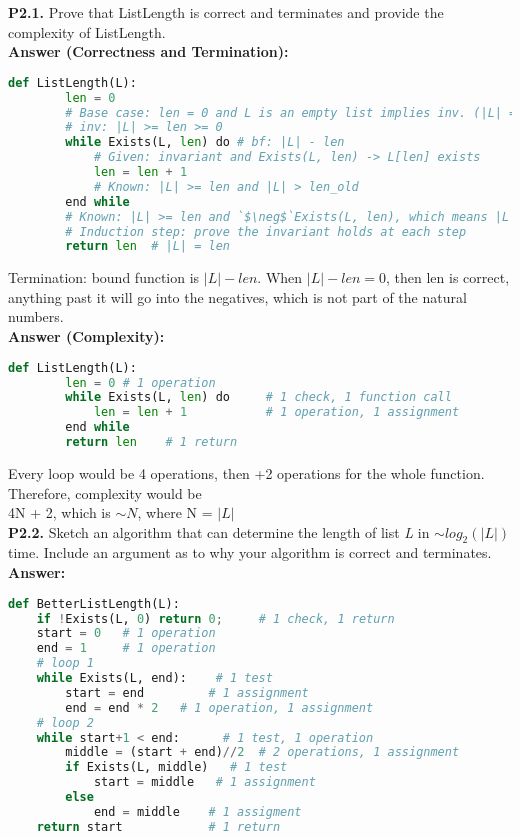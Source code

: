 \documentclass{article}
\begin{document}
\noindent
\textbf{P2.1.} Prove that ListLength is correct and terminates and provide the complexity of ListLength. \\

\noindent \textbf{Answer (Correctness and Termination): }

\begin{lstlisting}[language=Python]
    def ListLength(L):
        len = 0
        # Base case: len = 0 and L is an empty list implies inv. (|L| = len = 0)
        # inv: |L| >= len >= 0
        while Exists(L, len) do # bf: |L| - len
            # Given: invariant and Exists(L, len) -> L[len] exists
            len = len + 1
            # Known: |L| >= len and |L| > len_old
        end while
        # Known: |L| >= len and `$\neg$`Exists(L, len), which means |L| must be = len
        # Induction step: prove the invariant holds at each step
        return len  # |L| = len
\end{lstlisting}

\noindent Termination: bound function is $|L| - len$. When $|L| - len = 0$, then len is correct, anything past it will go into the negatives, which is not part of the natural numbers.\\

\noindent \textbf{Answer (Complexity): }

\begin{lstlisting}[language=Python]
    def ListLength(L):
        len = 0 # 1 operation   
        while Exists(L, len) do     # 1 check, 1 function call
            len = len + 1           # 1 operation, 1 assignment
        end while
        return len    # 1 return
\end{lstlisting}

\noindent Every loop would be 4 operations, then +2 operations for the whole function.
Therefore, complexity would be \\4N + 2, which is $\sim N$, where N = $|L|$\\

\textbf{P2.2.} Sketch an algorithm that can determine the length of list \textit{L} in $\sim log _2
(|L|)$ time. Include an argument as to why your algorithm is correct and terminates.\\

\noindent \textbf{Answer: }

\begin{lstlisting}[language=Python]
def BetterListLength(L):
    if !Exists(L, 0) return 0;     # 1 check, 1 return
    start = 0   # 1 operation
    end = 1     # 1 operation
    # loop 1
    while Exists(L, end):    # 1 test
        start = end         # 1 assignment
        end = end * 2   # 1 operation, 1 assignment
    # loop 2
    while start+1 < end:      # 1 test, 1 operation
        middle = (start + end)//2  # 2 operations, 1 assignment
        if Exists(L, middle)   # 1 test
            start = middle   # 1 assignment
        else
            end = middle    # 1 assigment
    return start            # 1 return
        
\end{lstlisting}
\end{document}
